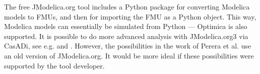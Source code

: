 The free JModelica.org tool includes a Python package for converting Modelica models to FMUs, and then for importing the FMU as a Python object. This way, Modelica models can essentially be simulated from Python — Optimica is also supported. It is possible to do more advanced analysis with JModelica.org3 via CasADi, see e.g. \cite{pythonperera} and \cite{pythonpereraparameter}. However, the possibilities in the work of Perera et al. use an old version of JModelica.org. It would be more ideal if these possibilities were supported by the tool developer.





